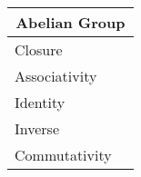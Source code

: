 \documentclass[a4paper,12pt]{scrartcl}    %
\begin{document}
\begin{landscape}
\begin{minipage}[t][]{0.60 \linewidth}
\begin{minipage}[c]{0,5\textwidth}
\begin{tabular}{|l|p{2cm}|}
			  \hline
			  \multicolumn{2}{c}{\cellcolor{yellow!25}Abelian Group} \\
			  \hline
			   \cellcolor{blue!25} Closure&  \\
			    \cellcolor{blue!25} Associativity&  \\
			    \cellcolor{blue!25} Identity&  \\
			    \cellcolor{blue!25} Inverse&  \\
			    \cellcolor{blue!25} Commutativity&  \\
			  \hline
			\end{tabular}
			\vfill
		\end{minipage}
	\end{minipage}	





\end{landscape}
\end{document}
